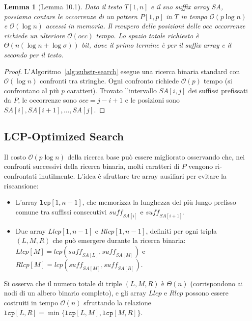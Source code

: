 \documentclass[12pt, a4paper, oneside]{book}
\theoremstyle{plain}
\newtheorem{lemma}[teorema]{Lemma}
\theoremstyle{definition}
\theoremstyle{remark}
\newcommand{\OO}[1]{\mathcal{O}\!\left(#1\right)}
\begin{document}
\begin{lemma}[Lemma 10.1]
\label{lem:substr-basic}
Dato il testo $T[1,n]$ e il suo suffix array $SA$, possiamo contare le occorrenze di un pattern $P[1,p]$ in $T$ in tempo $\OO{p\log n}$ e $\OO{\log n}$ accessi in memoria. Il recupero delle posizioni delle $\mathit{occ}$ occorrenze richiede un ulteriore $\OO{\mathit{occ}}$ tempo. Lo spazio totale richiesto è $\Theta(n(\log n + \log\sigma))$ bit, dove il primo termine è per il suffix array e il secondo per il testo.
\end{lemma}

\begin{proof}
L'Algoritmo~\ref{alg:substr-search} esegue una ricerca binaria standard con $\OO{\log n}$ confronti tra stringhe. Ogni confronto richiede $\OO{p}$ tempo (si confrontano al più $p$ caratteri). Trovato l'intervallo $SA[i,j]$ dei suffissi prefissati da $P$, le occorrenze sono $\mathit{occ} = j - i + 1$ e le posizioni sono $SA[i], SA[i+1], \ldots, SA[j]$.
\end{proof}

\subsection{LCP-Optimized Search}
\label{subsec:lcp-search}

Il costo $\OO{p\log n}$ della ricerca base può essere migliorato osservando che, nei confronti successivi della ricerca binaria, molti caratteri di $P$ vengono ri-confrontati inutilmente. L'idea è sfruttare tre array ausiliari per evitare la riscansione:

\begin{itemize}
  \item L'array $\mathtt{lcp}[1, n-1]$, che memorizza la lunghezza del più lungo prefisso comune tra suffissi consecutivi $\mathit{suff}_{SA[i]}$ e $\mathit{suff}_{SA[i+1]}$.
  \item Due array $\mathit{Llcp}[1, n-1]$ e $\mathit{Rlcp}[1, n-1]$, definiti per ogni tripla $(L, M, R)$ che può emergere durante la ricerca binaria: $\mathit{Llcp}[M] = lcp(\mathit{suff}_{SA[L]}, \mathit{suff}_{SA[M]})$ e $\mathit{Rlcp}[M] = lcp(\mathit{suff}_{SA[M]}, \mathit{suff}_{SA[R]})$.
\end{itemize}

Si osserva che il numero totale di triple $(L,M,R)$ è $\Theta(n)$ (corrispondono ai nodi di un albero binario completo), e gli array $\mathit{Llcp}$ e $\mathit{Rlcp}$ possono essere costruiti in tempo $\OO{n}$ sfruttando la relazione $\mathtt{lcp}[L,R] = \min\{\mathtt{lcp}[L,M], \mathtt{lcp}[M,R]\}$.
\end{document}
